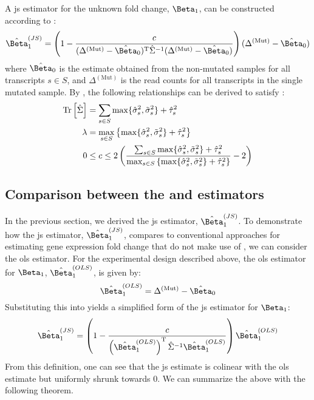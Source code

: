 A \gls{js} estimator for the unknown fold change, $\Beta_1$, can be constructed according to :
%
\begin{equation}
  \hat{\Beta}_1^{(JS)} = \left( 1 - \frac{c}{(\Delta^{(\mathrm{Mut})} - \hat{\Beta}_0)^\tran \hat{\Sigma}^{-1} (\Delta^{(\mathrm{Mut})} - \hat{\Beta}_0)} \right)(\Delta^{(\mathrm{Mut})} - \hat{\Beta}_0)
  \label{eqn:js_defn}
\end{equation}
%
where $\hat{\Beta}_0$ is the estimate obtained from the non-mutated samples for all transcripts $s \in S$, and $\Delta^{(\mathrm{Mut})}$ is the read counts for all transcripts in the single mutated sample.
By , the following relationships can be derived to satisfy :
%
\begin{align}
  \mathrm{Tr} \left[ \hat{\Sigma} \right] & = \sum_{s \in S} \max\{ \hat{\sigma}_s^2, \tilde{\sigma}_s^2 \} + \hat{\tau}_s^2                                                                                                                                      \\
  \lambda              & = \max_{s \in S} \left\{ \max\{ \hat{\sigma}_s^2, \tilde{\sigma}_s^2 \} + \hat{\tau}_s^2 \right\}                                                                                                                     \\
  0                    & \le c \le 2 \left( \frac{\sum_{s \in S} \max\{ \hat{\sigma}_s^2, \tilde{\sigma}_s^2 \} + \hat{\tau}_s^2}{\max_{s \in S} \left\{ \max\{ \hat{\sigma}_s^2, \tilde{\sigma}_s^2 \} + \hat{\tau}_s^2 \right\}} - 2 \right)
  \label{eqn:js_scaling_bounds}
\end{align}

\subsection{Comparison between the  and  estimators}

In the previous section, we derived the \gls{js} estimator, $\hat{\Beta}_1^{(JS)}$.
To demonstrate how the \gls{js} estimator, $\hat{\Beta}_1^{(JS)}$, compares to conventional approaches for estimating gene expression fold change that do not make use of , we can consider the \gls{ols} estimator.
For the experimental design described above, the \gls{ols} estimator for $\Beta_1$, $\hat{\Beta}_1^{(OLS)}$, is given by:
%
\begin{equation}
  \hat{\Beta}_1^{(OLS)} = \Delta^{(\mathrm{Mut})} - \hat{\Beta}_0
  \label{eqn:ols_defn}
\end{equation}
%
Substituting this into  yields a simplified form of the \gls{js} estimator for $\Beta_1$:
%
\begin{equation}
  \hat{\Beta}_1^{(JS)} = \left( 1 - \frac{c}{\left( \hat{\Beta}_1^{(OLS)} \right)^\tran \hat{\Sigma}^{-1} \hat{\Beta}_1^{(OLS)}} \right) \hat{\Beta}_1^{(OLS)}
  \label{eqn:js_defn_ols}
\end{equation}
%
From this definition, one can see that the \gls{js} estimate is colinear with the \gls{ols} estimate but uniformly shrunk towards 0.
We can summarize the above with the following theorem.

